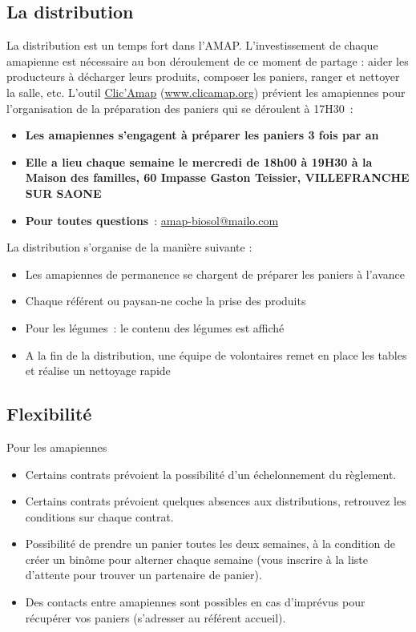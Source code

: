 \documentclass[8pt,a4paper,french]{article}
\makeatletter
\newcommand{\authoredby}[1]{\addtocontents{toc}{\protect\@nameuse{authoredby#1}}}%
\makeatother
\begin{document}
\authoredby{B}
\subsection{La distribution}\label{subsec:distribution}

\noindent La distribution est un temps fort dans l'AMAP. L'investissement de
chaque amapienne est nécessaire au bon déroulement de ce moment de
partage : aider les producteurs à décharger leurs produits, composer
les paniers, ranger et nettoyer la salle, etc.
L'outil \href{https://www.clicamap.org/}{Clic'Amap}
(\href{https://www.clicamap.org/}{www.clicamap.org})
prévient les amapiennes pour l'organisation de {\color{ForestGreen} la préparation des paniers qui se déroulent à 17H30}\ :
\begin{itemize}[label=]
\item {\bf Les amapiennes s'engagent à préparer les paniers 3 fois par an}
\item {\bf Elle a lieu chaque semaine le mercredi de 18h00 à 19H30 à la Maison des familles, 60 Impasse Gaston Teissier, VILLEFRANCHE SUR SAONE}
\item {\bf Pour toutes questions}\ : \href{mailto:amap-biosol@mailo.com}{amap-biosol@mailo.com}
\end{itemize}

\noindent La distribution s'organise de la manière suivante :
\begin{itemize}[label=]
\item Les amapiennes de permanence se chargent de préparer les paniers à l'avance
\item Chaque référent ou paysan-ne coche la prise des produits
\item Pour les légumes\ : le contenu des légumes est affiché 
\item A la fin de la distribution, une équipe de volontaires remet en place les tables et réalise un nettoyage rapide
\end{itemize}

\authoredby{B}
\subsection{Flexibilité}\label{subsec:flexibilité}

\noindent Pour les amapiennes
\begin{itemize}[label=]
\item Certains contrats prévoient la possibilité d'un échelonnement du règlement.
\item Certains contrats prévoient quelques absences aux distributions, retrouvez les conditions sur chaque contrat.
\item Possibilité de prendre un panier toutes les deux semaines, à la condition de créer un binôme pour alterner chaque semaine (vous inscrire à la liste d'attente pour trouver un partenaire de panier).
\item Des contacts entre amapiennes sont possibles en cas d'imprévus pour récupérer vos paniers (s'adresser au référent accueil).
\end{itemize}
\end{document}
